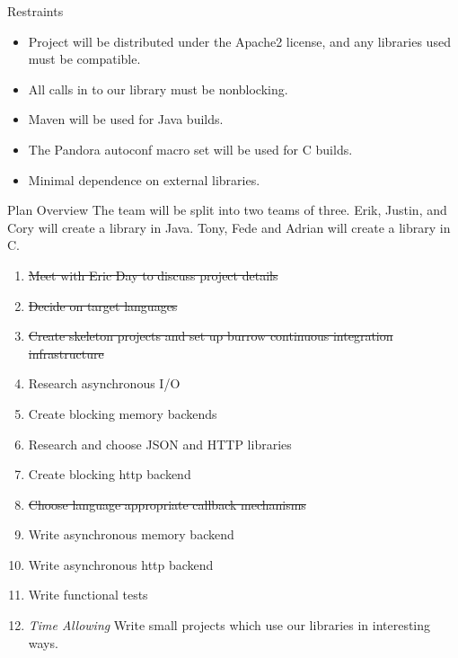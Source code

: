 \documentclass{beamer}
\begin{document}
\begin{frame}{Restraints}

  \begin{itemize}
  \item Project will be distributed under the Apache2 license, and any libraries used must be compatible.
  \item All calls in to our library must be nonblocking.
  \item Maven will be used for Java builds.
  \item The Pandora autoconf macro set will be used for C builds.
  \item Minimal dependence on external libraries.
  \end{itemize}

\end{frame}

\begin{frame}{Plan Overview}
  The team will be split into two teams of three.
  Erik, Justin, and Cory will create a library in Java.
  Tony, Fede and Adrian will create a library in C.

  \begin{enumerate}
  \item \sout{Meet with Eric Day to discuss project details}
  \item \sout{Decide on target languages}
  \item \sout{Create skeleton projects and set up burrow continuous integration infrastructure}
  \item Research asynchronous I/O
  \item Create blocking memory backends
  \item Research and choose JSON and HTTP libraries
  \item Create blocking http backend 
  \item \sout{Choose language appropriate callback mechanisms}
  \item Write asynchronous memory backend
  \item Write asynchronous http backend
  \item Write functional tests
  \item \textit{Time Allowing} Write small projects which use our libraries in interesting ways.
  \end{enumerate}
\end{frame}
\end{document}
